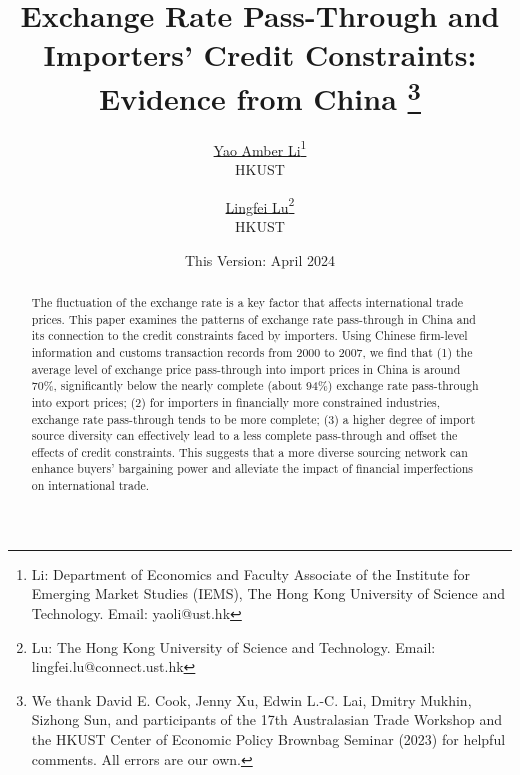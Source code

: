 

\linespread{1.2}
\geometry{a4paper,scale=0.75}



\title{  \Large \textbf{Exchange Rate Pass-Through and Importers' Credit Constraints: Evidence from China} 
\thanks{We thank David E. Cook, Jenny Xu, Edwin L.-C. Lai, Dmitry Mukhin, Sizhong Sun, and participants of the 17th Australasian Trade Workshop and the HKUST Center of Economic Policy Brownbag Seminar (2023) for helpful comments. All errors are our own.}}

\author{\large \href{http://yaoli.people.ust.hk/}{Yao Amber Li}\footnote{Li: Department of Economics and Faculty Associate of the Institute for Emerging Market Studies (IEMS), The Hong Kong University of Science and Technology. Email: yaoli@ust.hk}\\ {HKUST}
\and \href{}{Lingfei Lu}\footnote{Lu: The Hong Kong University of Science and Technology. Email: lingfei.lu@connect.ust.hk} \\ {HKUST} }

\date{This Version: April 2024}

\maketitle

\begin{abstract}
The fluctuation of the exchange rate is a key factor that affects international trade prices. This paper examines the patterns of exchange rate pass-through in China and its connection to the credit constraints faced by importers. Using Chinese firm-level information and customs transaction records from 2000 to 2007, we find that (1) the average level of exchange price pass-through into import prices in China is around 70\%, significantly below the nearly complete (about 94\%) exchange rate pass-through into export prices; (2) for importers in financially more constrained industries, exchange rate pass-through tends to be more complete; (3) a higher degree of import source diversity can effectively lead to a less complete pass-through and offset the effects of credit constraints. This suggests that a more diverse sourcing network can enhance buyers' bargaining power and alleviate the impact of financial imperfections on international trade.

\end{abstract}

